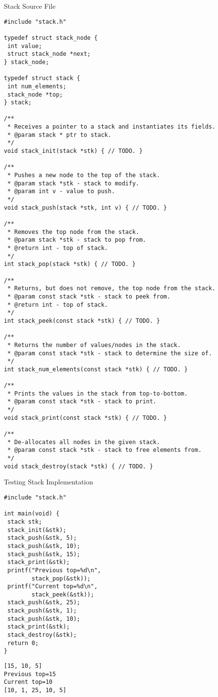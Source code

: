 \begin{cl}[stack.c]{Stack Source File}
\begin{lstlisting}[language=MyC]
#include "stack.h"

typedef struct stack_node {
 int value;
 struct stack_node *next;
} stack_node;

typedef struct stack {
 int num_elements;
 stack_node *top;
} stack;

/**
 * Receives a pointer to a stack and instantiates its fields.
 * @param stack * ptr to stack.
 */
void stack_init(stack *stk) { // TODO. }

/**
 * Pushes a new node to the top of the stack.
 * @param stack *stk - stack to modify.
 * @param int v - value to push.
 */
void stack_push(stack *stk, int v) { // TODO. }

/**
 * Removes the top node from the stack.
 * @param stack *stk - stack to pop from.
 * @return int - top of stack.
 */
int stack_pop(stack *stk) { // TODO. }

/**
 * Returns, but does not remove, the top node from the stack.
 * @param const stack *stk - stack to peek from.
 * @return int - top of stack.
 */
int stack_peek(const stack *stk) { // TODO. }

/**
 * Returns the number of values/nodes in the stack.
 * @param const stack *stk - stack to determine the size of.
 */
int stack_num_elements(const stack *stk) { // TODO. }

/**
 * Prints the values in the stack from top-to-bottom.
 * @param const stack *stk - stack to print.
 */
void stack_print(const stack *stk) { // TODO. }

/**
 * De-allocates all nodes in the given stack.
 * @param const stack *stk - stack to free elements from.
 */
void stack_destroy(stack *stk) { // TODO. }

\end{lstlisting}
\end{cl}

\begin{cloast}[main.c]{Testing Stack Implementation}
\begin{lstlisting}[language=MyC]
#include "stack.h"

int main(void) {
 stack stk;
 stack_init(&stk);
 stack_push(&stk, 5);
 stack_push(&stk, 10);
 stack_push(&stk, 15);
 stack_print(&stk);
 printf("Previous top=%d\n", 
        stack_pop(&stk));
 printf("Current top=%d\n",
        stack_peek(&stk));
 stack_push(&stk, 25);
 stack_push(&stk, 1);
 stack_push(&stk, 10);
 stack_print(&stk);
 stack_destroy(&stk);
 return 0;
}
\end{lstlisting}
\tcblower
\begin{lstlisting}[language=MyOutput]
[15, 10, 5]
Previous top=15
Current top=10
[10, 1, 25, 10, 5]
\end{lstlisting}
\end{cloast}


